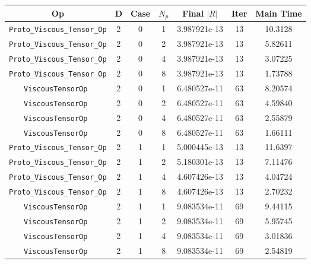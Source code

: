 \documentclass{article}
\begin{document}
\begin{small}
\begin{table}
\begin{center}
\begin{tabular}{|c|c|c|c|c|c||c|} \hline
 Op & D & Case & $N_p$ & Final $|R|$  &  Iter & Main Time \\
\hline
 {\tt Proto\_Viscous\_Tensor\_Op}      & 2 & 0 & 1   & 3.987921e-13   & 13      & 10.3128    \\
 {\tt Proto\_Viscous\_Tensor\_Op}      & 2 & 0 & 2   & 3.987921e-13   & 13      & 5.82611    \\
 {\tt Proto\_Viscous\_Tensor\_Op}      & 2 & 0 & 4   & 3.987921e-13   & 13      & 3.07225    \\
 {\tt Proto\_Viscous\_Tensor\_Op}      & 2 & 0 & 8   & 3.987921e-13   & 13      & 1.73788    \\
\hline                                                                        
 {\tt ViscousTensorOp   }              & 2 & 0 & 1   & 6.480527e-11   & 63      & 8.20574    \\
 {\tt ViscousTensorOp   }              & 2 & 0 & 2   & 6.480527e-11   & 63      & 4.59840    \\
 {\tt ViscousTensorOp   }              & 2 & 0 & 4   & 6.480527e-11   & 63      & 2.55879    \\
 {\tt ViscousTensorOp   }              & 2 & 0 & 8   & 6.480527e-11   & 63      & 1.66111    \\
\hline
 {\tt Proto\_Viscous\_Tensor\_Op}      & 2 & 1 & 1   & 5.000445e-13   & 13      & 11.6397    \\
 {\tt Proto\_Viscous\_Tensor\_Op}      & 2 & 1 & 2   & 5.180301e-13   & 13      & 7.11476    \\
 {\tt Proto\_Viscous\_Tensor\_Op}      & 2 & 1 & 4   & 4.607426e-13   & 13      & 4.04724    \\
 {\tt Proto\_Viscous\_Tensor\_Op}      & 2 & 1 & 8   & 4.607426e-13   & 13      & 2.70232    \\
\hline                                                                         
 {\tt ViscousTensorOp   }              & 2 & 1 & 1   & 9.083534e-11   & 69      & 9.44115    \\
 {\tt ViscousTensorOp   }              & 2 & 1 & 2   & 9.083534e-11   & 69      & 5.95745    \\
 {\tt ViscousTensorOp   }              & 2 & 1 & 4   & 9.083534e-11   & 69      & 3.01836    \\
 {\tt ViscousTensorOp   }              & 2 & 1 & 8   & 9.083534e-11   & 69      & 2.54819    \\

\end{tabular}
\end{center}
\end{table}
\end{small}
\end{document}
